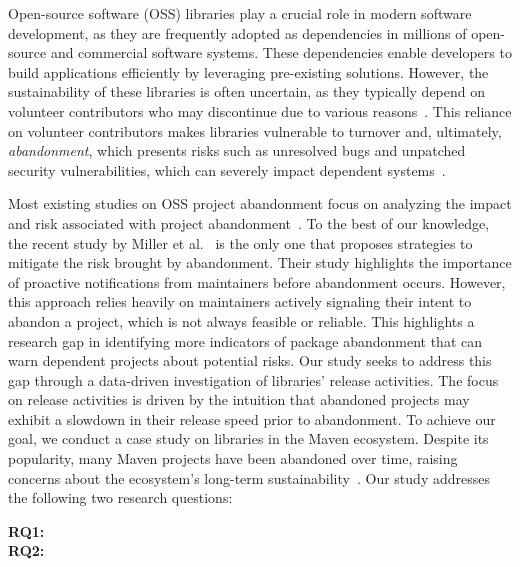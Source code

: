 Open-source software (OSS) libraries play a crucial role in modern software development, as they are frequently adopted as dependencies in millions of open-source and commercial software systems. These dependencies enable developers to build applications efficiently by leveraging pre-existing solutions. However, the sustainability of these libraries is often uncertain, as they typically depend on volunteer contributors who may discontinue due to various reasons~\cite{lin2017developer,forsgren20212020,kaur2022exploring}. This reliance on volunteer contributors makes libraries vulnerable to turnover and, ultimately, \textit{abandonment}, which presents risks such as unresolved bugs and unpatched security vulnerabilities, which can severely impact dependent systems~\cite{zimmermann2019small,miller2023we}. 

Most existing studies on OSS project abandonment focus on analyzing the impact and risk associated with project abandonment~\cite{valiev2018ecosystem,avelino2019abandonment,coelho2020github,cogo2021deprecation,ait2022empirical,miller2023we,miller2025understanding}. To the best of our knowledge, the recent study by Miller et al.~\cite{miller2025understanding} is the only one that proposes strategies to mitigate the risk brought by abandonment. Their study highlights the importance of proactive notifications from maintainers before abandonment occurs. However, this approach relies heavily on maintainers actively signaling their intent to abandon a project, which is not always feasible or reliable. This highlights a research gap in identifying more indicators of package abandonment that can warn dependent projects about potential risks. Our study seeks to address this gap through a data-driven investigation of libraries' release activities. The focus on release activities is driven by the intuition that abandoned projects may exhibit a slowdown in their release speed prior to abandonment.
To achieve our goal, we conduct a case study on libraries in the Maven ecosystem. Despite its popularity, many Maven projects have been abandoned over time, raising concerns about the ecosystem’s long-term sustainability~\cite{shen2025understanding}. Our study addresses the following two research questions: 
\begin{description}
 \item[\textbf{RQ1:}] \rqone
 \item[\textbf{RQ2:}] \rqtwo
\end{description}

